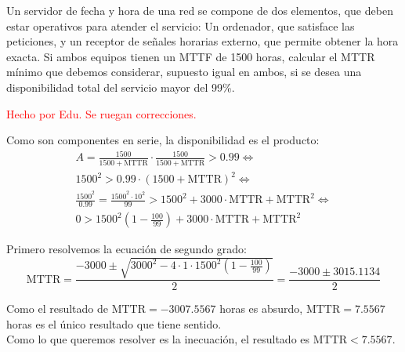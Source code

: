 \begin{problem}[5]
Un servidor de fecha y hora de una red se compone de dos elementos, que deben estar operativos para atender el servicio: Un ordenador, que satisface las peticiones, y un receptor
de señales horarias externo, que permite obtener la hora exacta. Si ambos equipos tienen un MTTF de 1500 horas, calcular el MTTR mínimo que debemos considerar, supuesto igual en ambos, si se desea una disponibilidad total del servicio mayor del 99\%.

\solution
\textcolor{red}{Hecho por Edu. Se ruegan correcciones.}

Como son componentes en serie, la disponibilidad es el producto:
\begin{gather*}
A = \frac{1500}{1500+\text{MTTR}} \cdot \frac{1500}{1500+\text{MTTR}} > 0.99 \iff\\
1500^2 > 0.99 \cdot (1500+\text{MTTR})^2 \iff \\
\frac{1500^2}{0.99} = \frac{1500^2 \cdot 10^2}{99} > 1500^2 + 3000 \cdot \text{MTTR} + \text{MTTR}^2 \iff \\
0 > 1500^2(1 -\frac{100}{99}) + 3000 \cdot \text{MTTR} + \text{MTTR}^2
\end{gather*}

Primero resolvemos la ecuación de segundo grado:
\[ \text{MTTR} = \frac{-3000 \pm \sqrt{3000^2 - 4 \cdot 1 \cdot 1500^2(1 -\frac{100}{99})}}{2} = \frac{-3000 \pm 3015.1134}{2} \]

Como el resultado de $\text{MTTR}=-3007.5567$ horas es absurdo, $\text{MTTR}=7.5567$ horas es el único resultado que tiene sentido.\\

Como lo que queremos resolver es la inecuación, el resultado es $\text{MTTR} < 7.5567$.
\end{problem}

